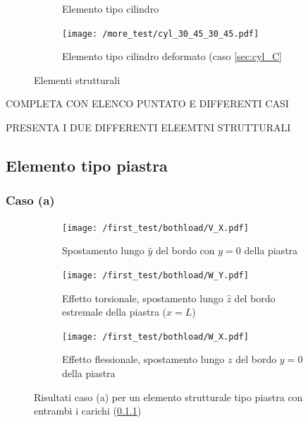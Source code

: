 \documentclass[a4paper,num-refs]{oup-contemporary}
\begin{document}
\begin{figure}[bt!]
\begin{subfigure}[t]{0.24\textwidth}
\caption{Elemento tipo cilindro}
		\label{fig:three sin x}
	\end{subfigure}
	\hfill
	\begin{subfigure}[t]{0.24\textwidth}
	\centering
 \texttt{[image: /more\_test/cyl\_30\_45\_30\_45.pdf]}
	\caption{Elemento tipo cilindro deformato (caso \cref{sec:cyl_C}}
	\label{fig:five ove x}
\end{subfigure}
	\hfill
	\caption{Elementi strutturali}
	\label{fig:three graphs}
\end{figure}



COMPLETA CON ELENCO PUNTATO E DIFFERENTI CASI 

PRESENTA I DUE DIFFERENTI ELEEMTNI STRUTTURALI
\textcolor{blue}{\lipsum[1-2]}





\subsection{Elemento tipo piastra}
\subsubsection{Caso (a)}
\label{sec:plate_A}

\begin{figure}[bt!]
	\centering

	\begin{subfigure}[t]{0.3\textwidth}
		\centering
		\texttt{[image: /first\_test/bothload/V\_X.pdf]}
		\caption{Spostamento lungo $\hat y$ del bordo con $y=0$ della piastra}
		
	\end{subfigure}
	\hfill
	\begin{subfigure}[t]{0.3\textwidth}
		\centering
\texttt{[image: /first\_test/bothload/W\_Y.pdf]}
		
		\caption{Effetto torsionale, spostamento lungo $\hat z$ del bordo estremale della piastra ($x=L$)}
		
	\end{subfigure}
	\hfill
	\begin{subfigure}[t]{0.3\textwidth}
		\centering
		\texttt{[image: /first\_test/bothload/W\_X.pdf]}
		\caption{Effetto flessionale, spostamento lungo $z$ del bordo $y=0$ della piastra}
		
	\end{subfigure}
	\hfill
	\caption{Risultati caso (a) per un elemento strutturale tipo piastra con entrambi i carichi (\cref{sec:plate_A})}
	\label{fig:plate_A_both_load}
\end{figure}
\end{document}
